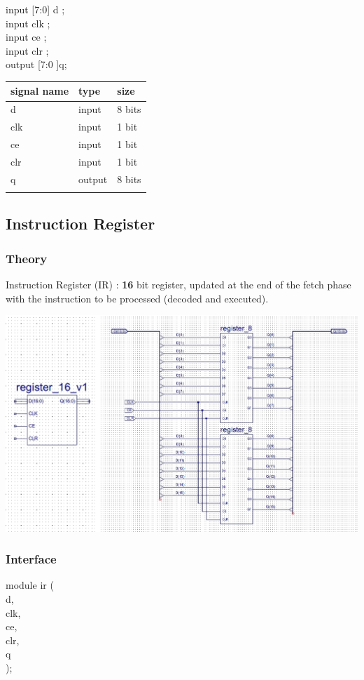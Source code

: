\documentclass[11pt]{article}
\begin{document}
input [7:0] d     ; \\
input clk         ;   \\
input ce      ; \\
input clr     ; \\
output [7:0 ]q; \\

\begin{center}
\begin{tabular}{lll}
signal name & type & size\\
\hline
d & input & 8 bits\\
clk & input & 1 bit\\
ce & input & 1 bit\\
clr & input & 1 bit\\
q & output & 8 bits\\
 &  & \\
\hline
\end{tabular}
\end{center}
\subsection{Instruction Register}
\label{sec:org9adb4ce}
\subsubsection{Theory}
\label{sec:org6ef4b12}
Instruction Register (IR) : \textbf{16} bit register, updated at the end of the fetch phase with the instruction to be processed (decoded and executed).
\begin{center}
\includegraphics[width=.9\linewidth]{./images/reg16.jpg}
\end{center}
\subsubsection{Interface}
\label{sec:orgefd689f}
module ir (\\
    d,\\
    clk,\\
    ce,\\
    clr,\\
    q\\
    );\\
\end{document}
